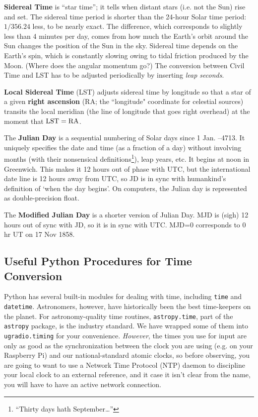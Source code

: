 \documentclass[11pt,preprint]{aastex}
\begin{document}
{\bf Sidereal Time} is ``star time''; it tells when
distant stars (i.e. not the Sun) rise and set. The sidereal time period is
shorter than the 24-hour Solar time period: $1/356.24$ less, to
be nearly exact. The difference, which corresponds to slightly 
less than 4 minutes per day, comes from how much the Earth's orbit around the
Sun changes the position of the Sun in the sky.
Sidereal time depends on the Earth's spin, which
is constantly slowing owing to tidal friction produced by the
Moon. (Where does the angular momentum go?) The conversion between Civil Time and LST has to be adjusted
periodically by inserting {\it leap seconds}.

{\bf Local Sidereal Time} (LST)
adjusts sidereal time by longitude so that a star of a given {\bf right ascension} 
(RA; the ``longitude" coordinate for celestial sources) transits the local meridian
(the line of longitude that goes right overhead) at the moment
that ${\rm LST}={\rm RA}$. 

The {\bf Julian Day} is a sequential numbering of Solar days since 1 Jan. --4713. 
It
uniquely specifies the date and time (as a fraction of a day) without 
involving 
months (with their nonsensical definitions\footnote{``Thirty days
  hath September\dots''}), leap years, etc. It begins at noon 
in Greenwich. This makes it 12 hours out of phase with UTC, but the
international date line is 12 hours away from UTC, so JD is in sync
with humankind's definition of `when the day begins'. 
On computers, the Julian day is represented as double-precision
float.

The {\bf Modified Julian Day} is a shorter version of Julian Day. MJD is (sigh) 12
hours out of sync with JD, so it is in sync with UTC.
MJD=0 corresponds to 0 hr UT on 17 Nov 1858.

\subsection{ Useful Python Procedures for Time Conversion}

\noindent
Python has several built-in modules for dealing with time, including {\tt time} 
and {\tt datetime}.
Astronomers, however, have historically been the best time-keepers on the planet.  For
astronomy-quality time routines, {\tt astropy.time}, part of the {\tt astropy} package, is
the industry standard.  We have wrapped some of them into {\tt ugradio.timing} for
your convenience. {\it However}, the times you use for input are only as good
as the synchronization between the clock you are using (e.g. on your Raspberry
Pi) and our national-standard atomic clocks, so before observing,
you are going to want to use a Network Time Protocol
(NTP) daemon to discipline your local clock to an external reference, and it case it
isn't clear from the name, you will have to have an active network connection.
\end{document}
